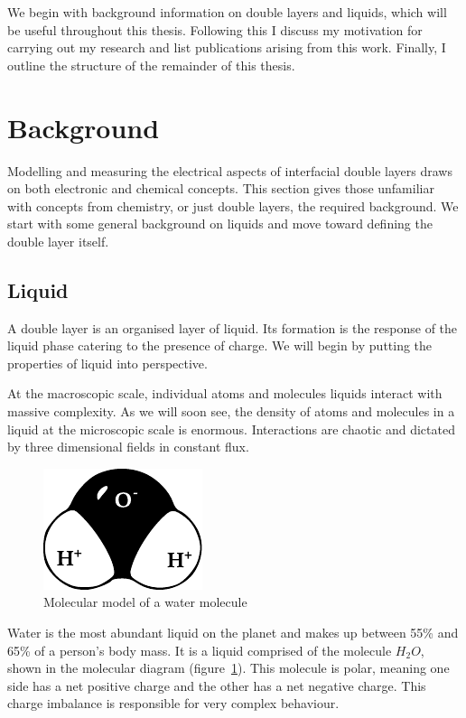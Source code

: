 

We begin with background information on double layers and liquids, which will be useful throughout this thesis.
Following this I discuss my motivation for carrying out my research and list publications arising from this work.
Finally, I outline the structure of the remainder of this thesis.

\section{Background}
  Modelling and measuring the electrical aspects of interfacial double layers draws on both electronic and chemical concepts.
  This section gives those unfamiliar with concepts from chemistry, or just double layers, the required background.
  We start with some general background on liquids and move toward defining the double layer itself.

  \subsection{Liquid}
    A double layer is an organised layer of liquid.
    Its formation is the response of the liquid phase catering to the presence of charge.
    We will begin by putting the properties of liquid into perspective.

    At the macroscopic scale, individual atoms and molecules liquids interact with massive complexity.
    As we will soon see, the density of atoms and molecules in a liquid at the microscopic scale is enormous.
    Interactions are chaotic and dictated by three dimensional fields in constant flux.

    \begin{figure}
        \begin{center}
            \includegraphics{content/introduction/graphics/polarWater}
        \end{center}
        \caption{Molecular model of a water molecule}
        \label{fig:waterMolecule}
    \end{figure}

    Water is the most abundant liquid on the planet and makes up between 55\% and 65\% of a person's body mass.
    It is a liquid comprised of the molecule $H_{2}O$, shown in the molecular diagram (figure~\ref{fig:waterMolecule}).
    This molecule is polar, meaning one side has a net positive charge and the other has a net negative charge.
    This charge imbalance is responsible for very complex behaviour.

